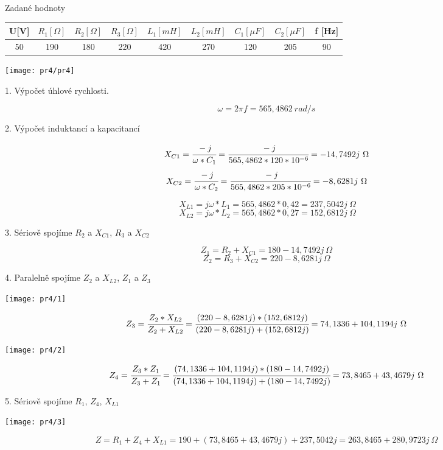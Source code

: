 \documentclass[a4paper,12pt]{article}
\begin{document}
Zadané hodnoty

\begin{tabular} {|  c | c |  c | c | c | c | c | c | c | }
\hline
U[V] &  $R_1 [\Omega]$  & $R_2 [\Omega]$  &$R_3 [\Omega]$  & $L_1 [mH]$ & $L_2 [mH]$ & $C_1[\mu F]$ & $C_2[\mu F]$  & f [Hz] \\ \hline
50 & 190 & 180 & 220 & 420 & 270 & 120 & 205 & 90\\ \hline
\end{tabular}
\bigskip

\begin{center}
\texttt{[image: pr4/pr4]}
\end{center}

1. Výpočet úhlové rychlosti.

$$
\omega = 2\pi f = 565,4862\ rad/s
$$

2. Výpočet induktancí a kapacitancí

$$
 X_{C1} = \cfrac{-j}{\omega * C_1} = \cfrac{-j}{565,4862 * 120 * 10^{-6}} = -14,7492j\ \Omega 
$$
$$
 X_{C2} = \cfrac{-j}{\omega * C_2} = \cfrac{-j}{565,4862 * 205 * 10^{-6}} = -8,6281j\ \Omega
$$

$$
\ X_{L1} = j\omega * L_1 = 565,4862 * 0,42  = 237,5042j\ \Omega 
$$
$$
\ X_{L2} = j\omega * L_2 = 565,4862 * 0,27  = 152,6812j\ \Omega
$$

3. Sériově spojíme $R_{2}$ a $X_{C1}$, $R_{3}$ a $X_{C2}$


$$Z_1 = R_2 + X_{C1} = 180 - 14,7492j\ \Omega$$
$$Z_2 = R_3 + X_{C2} = 220 - 8,6281j\ \Omega$$

4. Paralelně spojíme $Z_{2}$ a $X_{L2}$, $Z_{1}$ a $Z_{3}$
\begin{center}
\texttt{[image: pr4/1]}
\end{center}
$$ Z_{3} = \cfrac{Z_{2} * X_{L2}}{Z_{2} + X_{L2}} = \cfrac{(220 - 8,6281j) * (152,6812j)}{(220 - 8,6281j) + (152,6812j)} = 74,1336 + 104,1194j\ \Omega$$

\begin{center}
\texttt{[image: pr4/2]}
\end{center}

$$ Z_{4} = \cfrac{Z_{3} * Z_{1}}{Z_{3} + Z_{1}} = \cfrac{(74,1336 + 104,1194j) * (180 - 14,7492j)}{(74,1336 + 104,1194j) + (180 - 14,7492j)} = 73,8465 + 43,4679j\ \Omega$$

5. Sériově spojíme $R_{1}$, $Z_{4}$, $X_{L1}$
\begin{center}
\texttt{[image: pr4/3]}
\end{center}
$$
Z = R_1 + Z_4 + X_{L1} = 190 + (73,8465 + 43,4679j) + 237,5042j = 263,8465 + 280,9723j\ \Omega
$$
\end{document}
